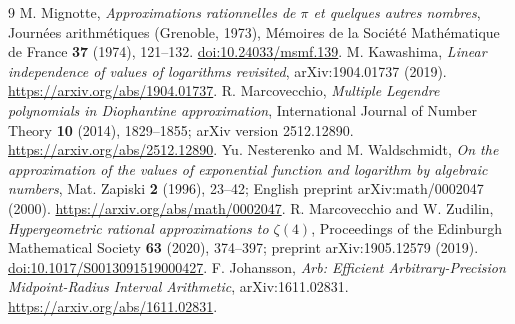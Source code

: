 \documentclass[11pt,a4paper]{article}
\numberwithin{equation}{section}
\theoremstyle{definition}
\theoremstyle{remark}
\begin{document}
\begingroup
\small
\setlength{\parskip}{0pt}
\tableofcontents
\endgroup
\clearpage









\clearpage

\appendix


\clearpage

\clearpage
\begin{thebibliography}{9}
M. Mignotte,
\emph{Approximations rationnelles de \(\pi\) et quelques autres nombres},
Journ\'ees arithm\'etiques (Grenoble, 1973),
M\'emoires de la Soci\'et\'e Math\'ematique de France
\textbf{37} (1974), 121--132.
\href{https://doi.org/10.24033/msmf.139}{doi:10.24033/msmf.139}.
M. Kawashima,
\emph{Linear independence of values of logarithms revisited},
arXiv:1904.01737 (2019).
\url{https://arxiv.org/abs/1904.01737}.
R. Marcovecchio,
\emph{Multiple Legendre polynomials in Diophantine approximation},
International Journal of Number Theory \textbf{10} (2014), 1829--1855;
arXiv version 2512.12890.
\url{https://arxiv.org/abs/2512.12890}.
Yu. Nesterenko and M. Waldschmidt,
\emph{On the approximation of the values of exponential function and
logarithm by algebraic numbers},
Mat. Zapiski \textbf{2} (1996), 23--42;
English preprint arXiv:math/0002047 (2000).
\url{https://arxiv.org/abs/math/0002047}.
R. Marcovecchio and W. Zudilin,
\emph{Hypergeometric rational approximations to \(\zeta(4)\)},
Proceedings of the Edinburgh Mathematical Society \textbf{63} (2020),
374--397; preprint arXiv:1905.12579 (2019).
\href{https://doi.org/10.1017/S0013091519000427}{doi:10.1017/S0013091519000427}.
F. Johansson,
\emph{Arb: Efficient Arbitrary-Precision Midpoint-Radius Interval Arithmetic},
arXiv:1611.02831.
\url{https://arxiv.org/abs/1611.02831}.
\end{thebibliography}
\end{document}
